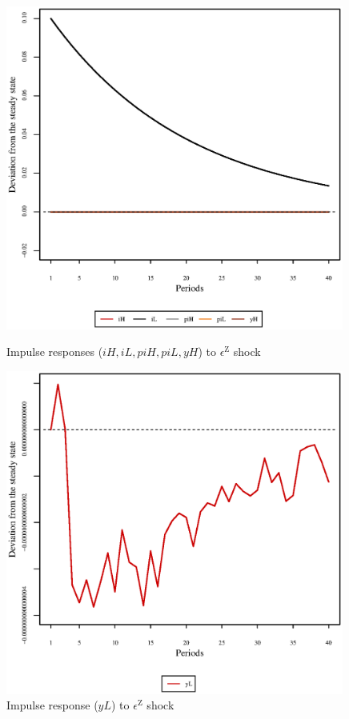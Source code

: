 \begin{figure}[h]
\begin{minipage}{0.5\textwidth}
\vspace*{-3em}
\centering
\includegraphics[width=0.99\textwidth, scale=0.55]{plots/plot_7.eps}
\caption{Impulse responses (${i\!H}, {i\!L}, {p\!i\!H}, {p\!i\!L}, {y\!H}$) to $\epsilon^{\mathrm{Z}}$ shock}
\end{minipage}
\begin{minipage}{0.5\textwidth}
\vspace*{-3em}
\centering
\includegraphics[width=0.99\textwidth, scale=0.55]{plots/plot_8.eps}
\caption{Impulse response (${y\!L}$) to $\epsilon^{\mathrm{Z}}$ shock}
\end{minipage}
\end{figure}


